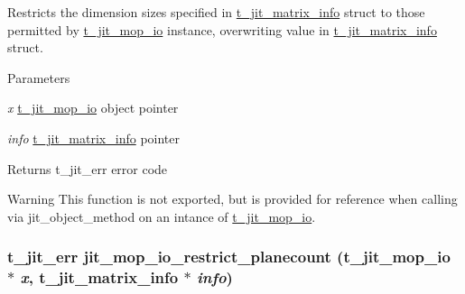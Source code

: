 Restricts the dimension sizes specified in \hyperlink{structt__jit__matrix__info}{t\_\-jit\_\-matrix\_\-info} struct to those permitted by \hyperlink{structt__jit__mop__io}{t\_\-jit\_\-mop\_\-io} instance, overwriting value in \hyperlink{structt__jit__matrix__info}{t\_\-jit\_\-matrix\_\-info} struct. 
\begin{DoxyParams}{Parameters}
\item[{\em x}]\hyperlink{structt__jit__mop__io}{t\_\-jit\_\-mop\_\-io} object pointer \item[{\em info}]\hyperlink{structt__jit__matrix__info}{t\_\-jit\_\-matrix\_\-info} pointer\end{DoxyParams}
\begin{DoxyReturn}{Returns}
t\_\-jit\_\-err error code
\end{DoxyReturn}
\begin{DoxyWarning}{Warning}
This function is not exported, but is provided for reference when calling via jit\_\-object\_\-method on an intance of \hyperlink{structt__jit__mop__io}{t\_\-jit\_\-mop\_\-io}. 
\end{DoxyWarning}
\hypertarget{group__mopmod_ga9cf9101515ddbe3ee3b4df7965e705f0}{
\subsubsection[{jit\_\-mop\_\-io\_\-restrict\_\-planecount}]{\setlength{\rightskip}{0pt plus 5cm}t\_\-jit\_\-err jit\_\-mop\_\-io\_\-restrict\_\-planecount ({\bf t\_\-jit\_\-mop\_\-io} $\ast$ {\em x}, \/  {\bf t\_\-jit\_\-matrix\_\-info} $\ast$ {\em info})}}
\label{group__mopmod_ga9cf9101515ddbe3ee3b4df7965e705f0}


